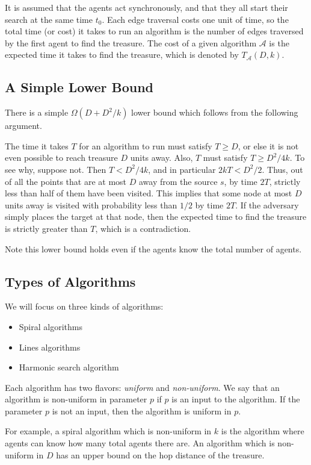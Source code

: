 \documentclass[runningheads,a4paper]{llncs}
\begin{document}
It is assumed that the agents act synchronously, and that they all start their search at the same time $t_0$. Each edge traversal costs one unit of time, so the total time (or cost) it takes to run an algorithm is the number of edges traversed by the first agent to find the treasure. The cost of a given algorithm $\mathcal{A}$ is the expected time it takes to find the treasure, which is denoted by $T_\mathcal{A}(D,k)$.

\subsection{A Simple Lower Bound}

There is a simple $\Omega(D+D^2/k)$ lower bound which follows from the following argument.

The time it takes $T$ for an algorithm to run must satisfy $T \geq D$, or else it is not even possible to reach treasure $D$ units away. Also, $T$ must satisfy $T \geq D^2/4k$. To see why, suppose not. Then $T < D^2/4k$, and in particular $2kT < D^2/2$. Thus, out of all the points that are at most $D$ away from the source $s$, by time $2T$, strictly less than half of them have been visited. This implies that some node at most $D$ units away is visited with probability less than $1/2$ by time $2T$. If the adversary simply places the target at that node, then the expected time to find the treasure is strictly greater than $T$, which is a contradiction.

Note this lower bound holds even if the agents know the total number of agents. 

\subsection{Types of Algorithms}
We will focus on three kinds of algorithms:
\begin{itemize}
\item Spiral algorithms
\item Lines algorithms
\item Harmonic search algorithm
\end{itemize}

Each algorithm has two flavors: \emph{uniform} and \emph{non-uniform}. We say that an algorithm is non-uniform in parameter $p$ if $p$ is an input to the algorithm. If the parameter $p$ is not an input, then the algorithm is uniform in $p$. 

For example, a spiral algorithm which is non-uniform in $k$ is the algorithm where agents can know how many total agents there are. An algorithm which is non-uniform in $D$ has an upper bound on the hop distance of the treasure. 
\end{document}
